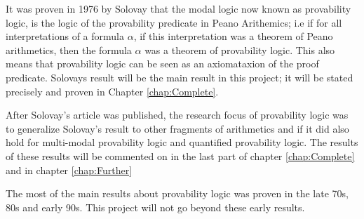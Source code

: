 \documentclass[../main.tex]{subfiles}
\begin{document}
It was proven in 1976 by Solovay that the modal
logic now known as provability logic, is the logic of the provability predicate
in Peano Arithemics; i.e if for all interpretations
of a formula $\alpha$, if this interpretation was a theorem of Peano
arithmetics,
then the formula $\alpha$ was a theorem of provability logic. This also means that
provability logic can be seen as an axiomataxion of the proof predicate.
Solovays result will be the main result in this project; it will be stated
precisely and proven in Chapter \ref{chap:Complete}.

After Solovay's article was published, the research focus of provability logic
was to generalize Solovay's result to other fragments of arithmetics and if
it did also hold for multi-modal provability logic and quantified provability
logic. The results of these results will be commented on in the last part of
chapter \ref{chap:Complete} and in chapter \ref{chap:Further}

The most of the main results about provability logic was proven in the late
70s, 80s and early 90s. This project will not go beyond these early results.
\end{document}
